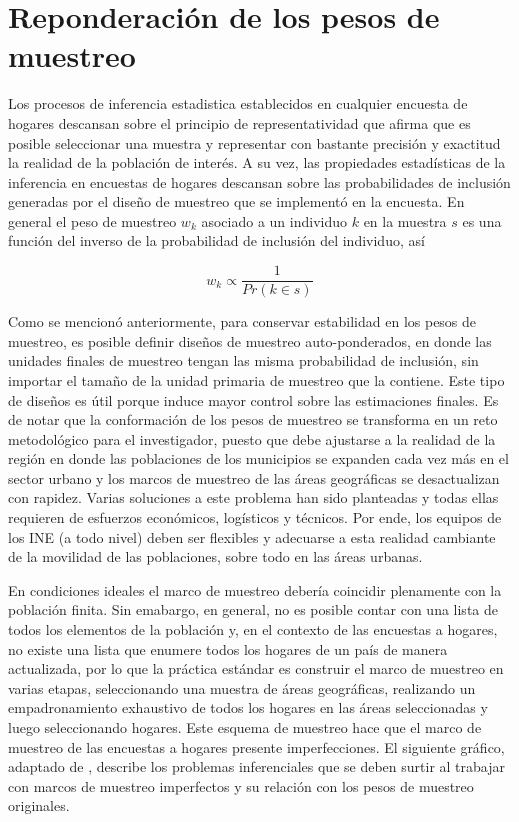 \hypertarget{reponderacion-de-los-pesos-de-muestreo}{%
\section{Reponderación de los pesos de muestreo}\label{reponderacion-de-los-pesos-de-muestreo}}

Los procesos de inferencia estadistica establecidos en cualquier encuesta de hogares descansan sobre el principio de representatividad que afirma que es posible seleccionar una muestra y representar con bastante precisión y exactitud la realidad de la población de interés. A su vez, las propiedades estadísticas de la inferencia en encuestas de hogares descansan sobre las probabilidades de inclusión generadas por el diseño de muestreo que se implementó en la encuesta. En general el peso de muestreo \(w_k\) asociado a un individuo \(k\) en la muestra \(s\) es una función del inverso de la probabilidad de inclusión del individuo, así

\[
w_k \propto \frac{1}{Pr(k\in s)}
\]

Como se mencionó anteriormente, para conservar estabilidad en los pesos de muestreo, es posible definir diseños de muestreo auto-ponderados, en donde las unidades finales de muestreo tengan las misma probabilidad de inclusión, sin importar el tamaño de la unidad primaria de muestreo que la contiene. Este tipo de diseños es útil porque induce mayor control sobre las estimaciones finales. Es de notar que la conformación de los pesos de muestreo se transforma en un reto metodológico para el investigador, puesto que debe ajustarse a la realidad de la región en donde las poblaciones de los municipios se expanden cada vez más en el sector urbano y los marcos de muestreo de las áreas geográficas se desactualizan con rapidez. Varias soluciones a este problema han sido planteadas \citep{Gambino_Silva_2009} y todas ellas requieren de esfuerzos económicos, logísticos y técnicos. Por ende, los equipos de los INE (a todo nivel) deben ser flexibles y adecuarse a esta realidad cambiante de la movilidad de las poblaciones, sobre todo en las áreas urbanas.

En condiciones ideales el marco de muestreo debería coincidir plenamente con la población finita. Sin emabargo, en general, no es posible contar con una lista de todos los elementos de la población y, en el contexto de las encuestas a hogares, no existe una lista que enumere todos los hogares de un país de manera actualizada, por lo que la práctica estándar es construir el marco de muestreo en varias etapas, seleccionando una muestra de áreas geográficas, realizando un empadronamiento exhaustivo de todos los hogares en las áreas seleccionadas y luego seleccionando hogares. Este esquema de muestreo hace que el marco de muestreo de las encuestas a hogares presente imperfecciones. El siguiente gráfico, adaptado de \citet{Valliant_Dever_2017}, describe los problemas inferenciales que se deben surtir al trabajar con marcos de muestreo imperfectos y su relación con los pesos de muestreo originales.

